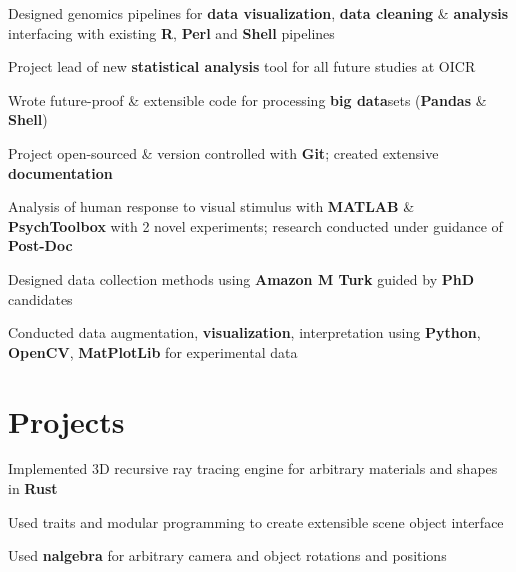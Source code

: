 \documentclass[]{chandan-cv}
\begin{document}
\begin{minipage}[t]{0.71\textwidth}
\begin{tightemize}
	\item Designed genomics pipelines for \textbf{data visualization}, \textbf{data cleaning} \& \textbf{analysis} interfacing with existing \textbf{R}, \textbf{Perl} and \textbf{Shell} pipelines
	\item Project lead of new \textbf{statistical analysis} tool for all future studies at OICR
	\item Wrote future-proof \& extensible code for processing \textbf{big data}sets (\textbf{Pandas} \& \textbf{Shell})
	\item Project open-sourced \& version controlled with \textbf{Git}; created extensive \textbf{documentation}
\end{tightemize}
\sectionsep

\begin{tightemize}
	\item Analysis of human response to visual stimulus with \textbf{MATLAB} \& \textbf{PsychToolbox} with 2 novel experiments; research conducted under guidance of \textbf{Post-Doc}
	\item Designed data collection methods using \textbf{Amazon M Turk} guided by \textbf{PhD} candidates
	\item Conducted data augmentation, \textbf{visualization}, interpretation using \textbf{Python}, \textbf{OpenCV}, \textbf{MatPlotLib} for experimental data
\end{tightemize}
\sectionsep


\section{Projects}

\descript{ }
\location{ }
\begin{tightemize}
        \item Implemented 3D recursive ray tracing engine for arbitrary materials and shapes in \textbf{Rust}
        \item Used traits and modular programming to create extensible scene object interface
	\item Used \textbf{nalgebra} for arbitrary camera and object rotations and positions
\end{tightemize}
\sectionsep


\end{minipage}
\end{document}
